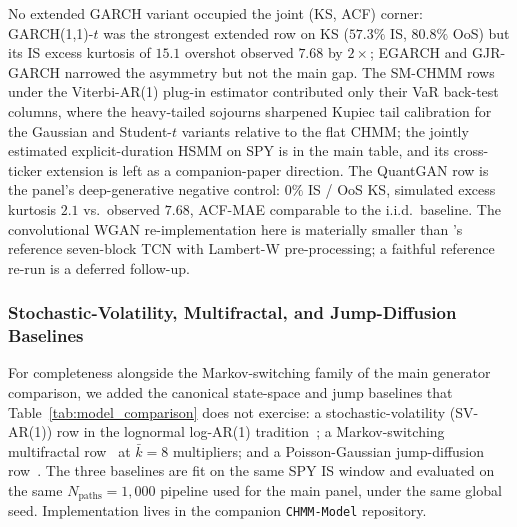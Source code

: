 No extended GARCH variant occupied the joint (KS, ACF) corner: GARCH(1,1)-$t$ was the strongest extended row on KS ($57.3\%$ IS, $80.8\%$ OoS) but its IS excess kurtosis of $15.1$ overshot observed $7.68$ by $2\times$; EGARCH and GJR-GARCH narrowed the asymmetry but not the main gap. The SM-CHMM rows under the Viterbi-AR(1) plug-in estimator contributed only their VaR back-test columns, where the heavy-tailed sojourns sharpened Kupiec tail calibration for the Gaussian and Student-$t$ variants relative to the flat CHMM; the jointly estimated explicit-duration HSMM on SPY is in the main table, and its cross-ticker extension is left as a companion-paper direction. The QuantGAN row is the panel's deep-generative negative control: $0\%$ IS / OoS KS, simulated excess kurtosis $2.1$ vs.\ observed $7.68$, ACF-MAE comparable to the i.i.d.\ baseline. The convolutional WGAN re-implementation here is materially smaller than \citet{wiese2020quantgan}'s reference seven-block TCN with Lambert-W pre-processing; a faithful reference re-run is a deferred follow-up.



\subsubsection{Stochastic-Volatility, Multifractal, and Jump-Diffusion Baselines}
\label{sec:sv_msm_jd_baselines}

For completeness alongside the Markov-switching family of the main generator comparison, we added the canonical state-space and jump baselines that Table~\ref{tab:model_comparison} does not exercise: a stochastic-volatility (SV-AR(1)) row in the lognormal log-AR(1) tradition~\citep{taylor1982financial,harvey1994multivariate}; a Markov-switching multifractal row~\citep{calvet2004regime} at $\bar k = 8$ multipliers; and a Poisson-Gaussian jump-diffusion row~\citep{merton1976option}. The three baselines are fit on the same SPY IS window and evaluated on the same $N_{\text{paths}} = 1{,}000$ pipeline used for the main panel, under the same global seed. Implementation lives in the companion \texttt{CHMM-Model} repository.

